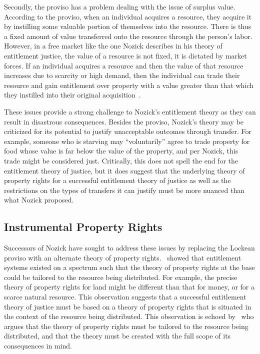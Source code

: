 Secondly, the proviso has a problem dealing with the issue of surplus value. 
According to the proviso, when an individual acquires a resource, they acquire
it by instilling some valuable portion of themselves into the resource. There is
thus a fixed amount of value transferred onto the resource through the person's
labor. However, in a free market like the one Nozick describes in his 
theory of entitlement justice, the value of a resource is not fixed, it is
dictated by market forces. If an individual acquires a resource and then the 
value of that resource increases due to scarcity or high demand, then the
individual can trade their resource and gain entitlement over property with a 
value greater than that which they instilled into their original
acquisition~\citep{Fried_1995}.

These issues provide a strong challenge to Nozick's entitlement theory as they
can result in disastrous consequences. Besides the proviso, Nozick's theory may
be criticized for its potential to justify unacceptable outcomes through
transfer. For example, someone who is starving may ``voluntarily'' agree to
trade property for food whose value is far below the value of the property, and
per Nozick, this trade might be considered just.  Critically, this does not
spell the end for the entitlement theory of justice, but it does suggest that
the underlying theory of property rights for a successful entitlement theory of
justice as well as the restrictions on the types of transfers it can justify
must be more nuanced than what Nozick proposed.

\subsection{Instrumental Property Rights}

Successors of Nozick have sought to address these issues by replacing the
Lockean proviso with an alternate theory of property
rights.~\cite{Van_der_Veen_1985} showed that entitlement systems existed on a
spectrum such that the theory of property rights at the base could be tailored
to the resource being distributed. For example, the precise theory of property
rights for land might be different than that for money, or for a scarce
natural resource. This observation suggests that a successful entitlement
theory of justice must be based on a theory of property rights that is
situated in the context of the resource being distributed. This observation
is echoed by~\cite{Fried_2004} who argues that the theory of property rights
must be tailored to the resource being distributed, and that the theory must
be created with the full scope of its consequences in mind.

